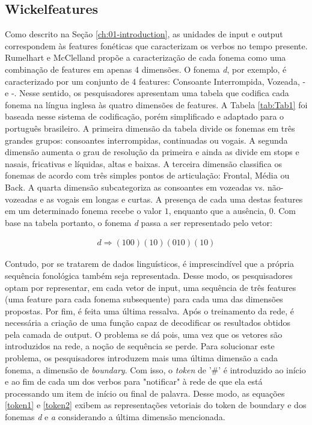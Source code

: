 \subsection{Wickelfeatures}
\label{sec:wickelfeatures}
Como descrito na Seção \ref{ch:01-introduction}, as unidades de input e output correspondem às features fonéticas que caracterizam os verbos no tempo presente. Rumelhart e McClelland propõe a caracterização de cada fonema como uma combinação de features em apenas 4 dimensões. O fonema \textit{d}, por exemplo, é caracterizado por um conjunto de 4 features: Consoante Interrompida, Vozeada, - e -. %
Nesse sentido, os pesquisadores apresentam uma tabela que codifica cada fonema na língua inglesa às quatro dimensões de features. A Tabela \ref{tab:Tab1} foi baseada nesse sistema de codificação, porém simplificado e adaptado para o português brasileiro. A primeira dimensão da tabela divide os fonemas em três grandes grupos: consoantes interrompidas, continuadas ou vogais. A segunda dimensão aumenta o grau de resolução da primeira e ainda as divide em stops e nasais, %
fricativas e líquidas, altas e baixas. A terceira dimensão classifica os fonemas de acordo com três simples pontos de articulação: Frontal, Média ou Back. %
A quarta dimensão subcategoriza as consoantes em vozeadas vs. não-vozeadas e as vogais em longas e curtas. A presença de cada uma destas features em um determinado fonema recebe o valor $1$, enquanto que a ausência, $0$.
Com base na tabela %
portanto, o fonema \textit{d} passa a ser representado pelo vetor:

\begin{align}
d \Rightarrow (100)(10)(010)(10)
\end{align}

Contudo, por se tratarem de dados linguísticos, é imprescindível que a própria sequência fonológica também seja representada. Desse modo, os pesquisadores optam por representar, em cada vetor de input, uma sequência de três features (uma feature para cada fonema subsequente) para cada uma das dimensões propostas. Por fim, é feita uma última ressalva. Após o treinamento da rede, é necessária a criação de uma função capaz de decodificar os resultados obtidos pela camada de output. O problema se dá pois, uma vez que os vetores são introduzidos na rede, a noção de sequência se perde. Para solucionar este problema, os pesquisadores introduzem mais uma última dimensão a cada fonema, a dimensão de \textit{boundary}. Com isso, o \textit{token} de '\#' é introduzido ao início e ao fim de cada um dos verbos para "notificar" à rede de que ela está processando um item de início ou final de palavra. Desse modo, as equações \ref{token1} e \ref{token2} exibem as representações vetoriais do token de boundary e dos fonemas \textit{d} e \textit{a} considerando a última dimensão mencionada.

